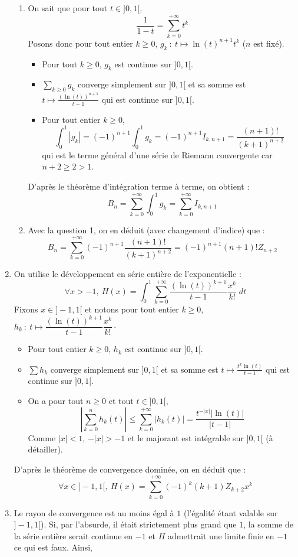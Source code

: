 \documentclass[twoside,french,11pt]{VcCours}
\newcommand{\enc}[1]{\fbox{#1}}
\begin{document}
\begin{enumerate}
\begin{enumerate}
  \item On sait que pour tout $t \in ]0,1[$,
  \[ \frac{1}{1-t}=\sum_{k=0}^{+\infty}t^k\]
  Posons donc  pour tout entier $k \geq 0$, $g_k\ :\ t\mapsto \ln(t)^{n+1}t^k$ ($n$ est fixé).
  \begin{itemize}
  \item Pour tout $k \geq 0$, $g_k$ est continue sur $]0,1[$.
  \item  $\sum_{k \geq 0} g_k$ converge simplement sur $]0,1[$ et sa somme est $t\mapsto \frac{(\ln(t))^{n+1}}{t-1}$ qui est continue sur $]0,1[$.
  \item Pour tout entier $k \geq 0$,
  $$\int_0^1|g_k|=(-1)^{n+1}\int_0^1g_k=(-1)^{n+1}I_{k,n+1}=\frac{(n+1)!}{(k+1)^{n+2}}$$
  qui est le terme général d'une série de Riemann convergente car $n+2\geq 2>1$.
  \end{itemize}
  D'après le théorème d'intégration terme à terme, on obtient :
  \[ \boxed{B_n=\sum_{k=0}^{+\infty}\int_0^1g_k=\sum_{k=0}^{+\infty}I_{k,n+1}}\]
  \item Avec la question 1, on en déduit (avec changement d'indice) que :
  \[ \boxed{B_n=\sum_{k=0}^{+\infty}(-1)^{n+1}\frac{(n+1)!}{(k+1)^{n+2}}=(-1)^{n+1}(n+1)!Z_{n+2}}\]
  \end{enumerate}
  \item On utilise le développement en série entière de l'exponentielle : 
  \[\forall x>-1,\ H(x)=\int_0^1\sum_{k=0}^{+\infty}\frac{(\ln(t))^{k+1}}{t-1}\frac{x^k}{k!}\;dt\]
  Fixons $x\in ]-1,1[$ et notons pour tout entier $k \geq 0$, $h_k\ :\ t\mapsto \dfrac{(\ln(t))^{k+1}}{t-1}\dfrac{x^k}{k!} \cdot$
  \begin{itemize}
  \item Pour tout entier $k \geq 0$, $h_k$ est continue sur $]0,1[$.
  \item $\sum h_k$ converge simplement sur $]0,1[$ et sa somme est $t\mapsto \frac{t^x\ln(t)}{t-1}$ qui est continue sur $]0,1[$.
  \item On a pour tout $n \geq 0$ et tout $t \in ]0,1[$,
  \[ \left |\sum_{k=0}^nh_k(t)\right |\leq \sum_{k=0}^{+\infty}|h_k(t)|=\frac{t^{-|x|}|\ln(t)|}{|t-1|}\]
  Comme $|x|<1$, $-|x|>-1$ et le majorant est intégrable sur $]0,1[$ (à détailler).
  \end{itemize}
  D'après le théorème de convergence dominée, on en déduit que :
  \[\boxed{\forall x\in ]-1,1[,\ H(x)=\sum_{k=0}^{+\infty}(-1)^k(k+1)Z_{k+2}x^k}\]
  \item Le rayon de convergence est au moins égal à $1$ (l'égalité étant valable sur $]-1,1[$). Si, par l'absurde, il était strictement plus grand que $1$, la somme de la série entière serait continue en $-1$ et $H$ admettrait une limite finie en $-1$ ce qui est faux. Ainsi,
  \enc{le rayon de convergence vaut donc $1$}
  \end{enumerate}
  
\end{document}
